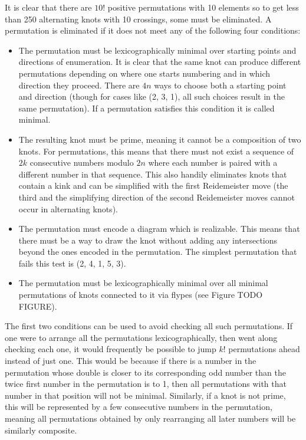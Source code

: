 \begin{paper}
It is clear that there are $10!$ positive permutations with 10 elements so to
get less than 250 alternating knots with 10 crossings, some must be eliminated.
A permutation is eliminated if it does not meet any of the following four
conditions:
\begin{itemize}
\item The permutation must be lexicographically minimal over starting points and
directions of enumeration.
It is clear that the same knot can produce different permutations depending on
where one starts numbering and in which direction they proceed.
There are $4n$ ways to choose both a starting point and direction (though for
cases like (2, 3, 1), all such choices result in the same permutation).
If a permutation satisfies this condition it is called minimal.
\item The resulting knot must be prime, meaning it cannot be a composition of
two knots.
For permutations, this means that there must not exist a sequence of $2k$
consecutive numbers modulo $2n$ where each number is paired with a different
number in that sequence.
This also handily eliminates knots that contain a kink and can be simplified
with the first Reidemeister move (the third and the simplifying direction of the
second Reidemeister moves cannot occur in alternating knots).
\item The permutation must encode a diagram which is realizable.
This means that there must be a way to draw the knot without adding any
intersections beyond the ones encoded in the permutation.
The simplest permutation that fails this test is (2, 4, 1, 5, 3).
\item The permutation must be lexicographically minimal over all minimal
permutations of knots connected to it via flypes (see Figure TODO FIGURE).
\end{itemize}

The first two conditions can be used to avoid checking all such permutations.
If one were to arrange all the permutations lexicographically, then went along
checking each one, it would frequently be possible to jump $k!$ permutations
ahead instead of just one.
This would be because if there is a number in the permutation whose double is
closer to its corresponding odd number than the twice first number in the
permutation is to 1, then all permutations with that number in that position
will not be minimal.
Similarly, if a knot is not prime, this will be represented by a few consecutive
numbers in the permutation, meaning all permutations obtained by only
rearranging all later numbers will be similarly composite.


\end{paper}
